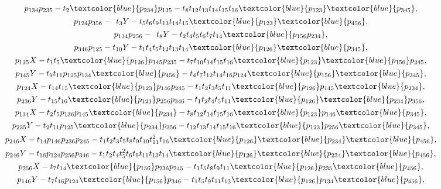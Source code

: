 \documentclass[pdftex]{sigma}%
\numberwithin{equation}{section}
\begin{document}
\begin{gather*}
p_{134}p_{235}-t_{2}\textcolor{blue}{p_{234}}p_{135}-t_{8}t_{12}t_{13}t_{14}t_{15}t_{16}\textcolor{blue}{p_{123}}\textcolor{blue}{p_{345}},\\[.2ex]
%
p_{124}p_{356} -{}_{\phantom{1}} t_{3}Y - t_{5}t_{6}t_{9}t_{13}t_{14}t_{15}\textcolor{blue}{p_{123}}\textcolor{blue}{p_{456}},\\[.2ex]
p_{134}p_{256} - {}_{\phantom{1}}t_{8}Y - t_{2}t_{4}t_{5}t_{6}t_{7}t_{14}\textcolor{blue}{p_{156}p_{234}}, \\[.2ex]
p_{346}p_{125} - t_{10}Y - t_{1}t_{4}t_{5}t_{12}t_{13}t_{14}\textcolor{blue}{p_{126}}\textcolor{blue}{p_{345}},
\\[.2ex]
p_{125}X-t_{1}t_{5}\textcolor{blue}{p_{126}}p_{145}p_{235}-t_{7}t_{10}t_{14}t_{15}t_{16} \textcolor{blue}{p_{123}}\textcolor{blue}{p_{156}}p_{245},\\[.2ex]
p_{145}Y-t_{9}t_{11}p_{125}p_{134}\textcolor{blue}{p_{456}}-t_{4}t_{7}t_{12}t_{14}t_{16}p_{124}\textcolor{blue}{p_{156}}\textcolor{blue}{p_{345}},\\[.2ex]
p_{124}X-t_{14}t_{15}\textcolor{blue}{p_{123}}p_{146}p_{245}-t_{1}t_{2}t_{3}t_{5}t_{11}\textcolor{blue}{p_{126}}p_{145}\textcolor{blue}{p_{234}},\\[.2ex]
p_{236}Y-t_{15}t_{16}\textcolor{blue}{p_{123}}p_{256}p_{346}-t_{1}t_{2}t_{4}t_{5}t_{11}\textcolor{blue}{p_{126}}\textcolor{blue}{p_{234}}p_{356},\\[.2ex]
p_{134}X-t_{2}t_{5}p_{136}p_{145}\textcolor{blue}{p_{234}}-t_{8}t_{12}t_{14}t_{15}t_{16}\textcolor{blue}{p_{123}}p_{146}\textcolor{blue}{p_{345}},\\[.2ex]
p_{235}Y-t_{2}t_{11}p_{125}\textcolor{blue}{p_{234}}p_{356}-t_{12}t_{13}t_{14}t_{15}t_{16}\textcolor{blue}{p_{123}}p_{256}\textcolor{blue}{p_{345}},\\[.2ex]
p_{246}X-t_{14}p_{146}p_{236}p_{245}-t_{1}t_{2}t_{3}t_{5}t_{8}t_{9}t_{10}t_{11}^2t_{16}\textcolor{blue}{p_{126}}\textcolor{blue}{p_{234}}\textcolor{blue}{p_{456}},\\[.2ex]
p_{246}Y-t_{16}p_{124}p_{256}p_{346}-t_{1}t_{2}t_{4}t_{5}^2t_{6}t_{9}t_{11}t_{13}t_{14}\textcolor{blue}{p_{126}}\textcolor{blue}{p_{234}}\textcolor{blue}{p_{456}},\\[.2ex]
p_{256}X-t_{7}t_{14}\textcolor{blue}{p_{156}}p_{236}p_{245}-t_{1}t_{5}t_{8}t_{9}t_{11}\textcolor{blue}{p_{126}}p_{235}\textcolor{blue}{p_{456}},\\[.2ex]
p_{146}Y-t_{7}t_{16}p_{124}\textcolor{blue}{p_{156}}p_{346}-t_{1}t_{5}t_{9}t_{11}t_{13}\textcolor{blue}{p_{126}}p_{134}\textcolor{blue}{p_{456}},\\[.2ex]

\end{gather*}
\end{document}
